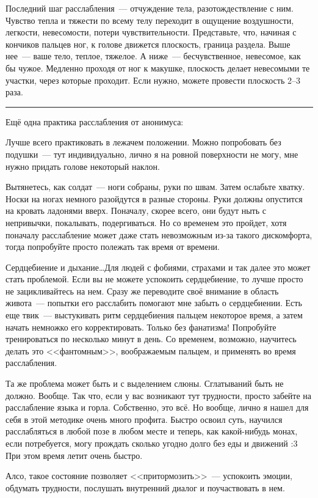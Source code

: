 \documentclass[a4paper,14pt,oneside]{memoir}
\begin{document}
Последний шаг расслабления~--- отчуждение тела, разотождествление с ним. Чувство тепла и тяжести по всему телу переходит в ощущение воздушности, легкости, невесомости, потери чувствительности. Представьте, что, начиная с кончиков пальцев ног, к голове движется плоскость, граница раздела. Выше нее~--- ваше тело, теплое, тяжелое. А ниже~--- бесчувственное, невесомое, как бы чужое. Медленно проходя от ног к макушке, плоскость делает невесомыми те участки, через которые проходит. Если нужно, можете провести плоскость 2--3 раза.

\smallskip
\fancybreak{* * *}

Ещё одна практика расслабления от анонимуса:

Лучше всего практиковать в лежачем положении. Можно попробовать без подушки~--- тут индивидуально, лично я на ровной поверхности не могу, мне нужно придать голове некоторый наклон.

Вытянетесь, как солдат~--- ноги собраны, руки по швам. Затем ослабьте хватку. Носки на ногах немного разойдутся в разные стороны. Руки должны опустится на кровать ладонями вверх. Поначалу, скорее всего, они будут ныть с непривычки, покалывать, подергиваться. Но со временем это пройдет, хотя поначалу расслабление может даже стать невозможным из-за такого дискомфорта, тогда попробуйте просто полежать так время от времени.

Сердцебиение и дыхание\ldots Для людей с фобиями, страхами и так далее это может стать проблемой. Если вы не можете успокоить сердцебиение, то лучше просто не зацикливайтесь на нем. Сразу же переводите своё внимание в область живота~--- попытки его расслабить помогают мне забыть о сердцебиении. Есть еще твик~--- выстукивать ритм сердцебиения пальцем некоторое время, а затем начать немножко его корректировать. Только без фанатизма! Попробуйте тренироваться по несколько минут в день. Со временем, возможно, научитесь делать это <<фантомным>>, воображаемым пальцем, и применять во время расслабления.

Та же проблема может быть и с выделением слюны. Сглатываний быть не должно. Вообще. Так что, если у вас возникают тут трудности, просто забейте на расслабление языка и горла.
Собственно, это всё. Но вообще, лично я нашел для себя в этой методике очень много профита. Быстро освоил суть, научился расслабляться в любой позе в любом месте и теперь, как какой-нибудь монах, если потребуется, могу прождать сколько угодно долго без еды и движений :3 При этом время летит очень быстро. 

Алсо, такое состояние позволяет <<притормозить>>~--- успокоить эмоции, обдумать трудности, послушать внутренний диалог и поучаствовать в нем.
\end{document}
